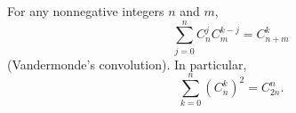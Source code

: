 For any nonnegative integers $n$ and $m$,
$$\sum_{j=0}^{n} C_n^j C_m^{k-j} = C_{n+m}^k$$
(Vandermonde's convolution). In particular,
$$\sum_{k=0}^{n} (C_n^k)^2 = C_{2n}^n.$$
